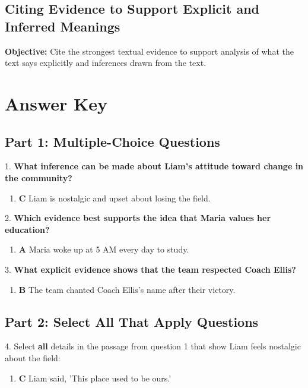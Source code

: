\documentclass[12pt]{article}
\begin{document}
\subsection*{Citing Evidence to Support Explicit and Inferred Meanings}
\onehalfspacing

\begin{tcolorbox}[colframe=black!40, colback=gray!0, title=Learning Objective]
\textbf{Objective:} Cite the strongest textual evidence to support analysis of what the text says explicitly and inferences drawn from the text.
\end{tcolorbox}


\section*{Answer Key}

\subsection*{Part 1: Multiple-Choice Questions}

1. \textbf{What inference can be made about Liam’s attitude toward change in the community?}
\begin{enumerate}[label=\Alph*.]
    \item \textbf{C} Liam is nostalgic and upset about losing the field.
\end{enumerate}

2. \textbf{Which evidence best supports the idea that Maria values her education?}
\begin{enumerate}[label=\Alph*.]
    \item \textbf{A} Maria woke up at 5 AM every day to study.
\end{enumerate}

3. \textbf{What explicit evidence shows that the team respected Coach Ellis?}
\begin{enumerate}[label=\Alph*.]
    \item \textbf{B} The team chanted Coach Ellis's name after their victory.
\end{enumerate}

\subsection*{Part 2: Select All That Apply Questions}

4. Select \textbf{all} details in the passage from question 1 that show Liam feels nostalgic about the field:
\begin{enumerate}[label=\Alph*.]
    \item \textbf{C} Liam said, 'This place used to be ours.'
\end{enumerate}
\end{document}
